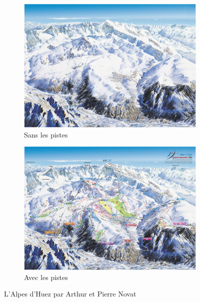 \begin{figure}[h!]
\centering
 \begin{subfigure}[t]{0.49\linewidth}
   \centering
   \includegraphics[width=1.0\linewidth]{novat/AlpeHuez.png}
   \caption{Sans les pistes}
 \end{subfigure}
 \begin{subfigure}[t]{0.49\linewidth}
   \centering
   \includegraphics[width=1.0\linewidth]{novat/AlpeHuez_pistes.png}
   \caption{Avec les pistes}
 \end{subfigure}
 \caption{L'Alpes d'Huez par Arthur et Pierre Novat}
\end{figure}
